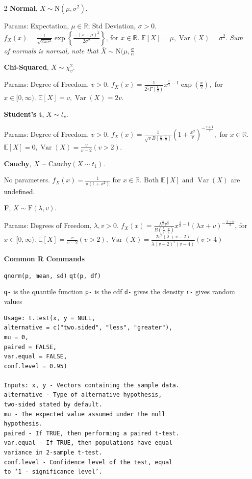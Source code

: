 \documentclass[10pt]{extarticle}
\theoremstyle{definition}
\theoremstyle{remark}
\newcommand{\R}{\mathbb{R}}
\newcommand{\E}{\mathbb{E}}
\DeclareMathOperator{\Var}{Var}
\begin{document}
\begin{multicols}{2}
    \textbf{Normal}, $X \sim \text{N}(\mu, \sigma^2)$.

    Params: Expectation, $\mu \in \R$; Std Deviation, $\sigma > 0$.
    $f_X(x) = \frac{1}{\sqrt{2 \pi \sigma^2}}\exp\left\{ \frac{-(x - \mu)^2}{2
    \sigma^2} \right\}$, for $x \in \R$.
    $\E[X] = \mu, \Var(X) = \sigma^2$.
    \textit{Sum of normals is normal, note that $\bar{X} \sim \text{N}(\mu, \frac{\sigma}{n}$}

    \textbf{Chi-Squared}, $X \sim \chi^2_{v}$.

    Params: Degree of Freedom, $v > 0$.
    $f_X(x) = \frac{1}{2^{\frac{v}{2}}\Gamma\left(\frac{k}{2}\right)}
            x^{\frac{v}{2}-1} \exp\left(\frac{x}{2}\right),$
    for $x \in [0, \infty)$.
    $\E[X] = v, \Var(X) = 2v$.

    \textbf{Student's $\mathbf{t}$}, $X \sim t_v$.

    Params: Degree of Freedom, $v > 0$.
    $f_X(x) = \frac{1}{\sqrt{v}B\left(\frac{v}{2},\frac{1}{2}\right)}
    \left(1 + \frac{x^2}{v}\right)^{-\frac{v+1}{2}},$
    for $x \in \R$.
    $\E[X] = 0, \Var(X) = \frac{v}{v-2}(v > 2)$.

    \textbf{Cauchy}, $X \sim \text{Cauchy} (X \sim t_1)$.

    No parameters. 
    $f_X(x) = \frac{1}{\pi (1 + x^2)}$ for $x \in \R$.
    Both $\E[X]$ and $\Var(X)$ are undefined.

    \textbf{F}, $X \sim \text{F}(\lambda, v)$.

    Params: Degrees of Freedom, $\lambda, v > 0$.
    $f_X(x) = \frac{\lambda^{\frac{\lambda}{2}}v^{\frac{v}{2}}}{B\left(\frac{\lambda}{2},\frac{v}{2}\right)}
    x^{\frac{\lambda}{2} - 1}(\lambda x + v)^{- \frac{\lambda + v}{2}}$,
    for $x \in [0, \infty)$. 
    $\E[X] = \frac{v}{v - 2} (v > 2), 
    \Var(X) = \frac{2v^2(\lambda + v - 2)}{\lambda(v - 2)^2(v - 4)} (v > 4) $


    \noindent
    {\large\textbf{Common R Commands}}

    \verb|qnorm(p, mean, sd)|
    \verb|qt(p, df)|

    \verb|q-| is the quantile function
    \verb|p-| is the cdf
    \verb|d-| gives the density
    \verb|r-| gives random values

    \begin{verbatim}
Usage: t.test(x, y = NULL, 
alternative = c("two.sided", "less", "greater"),
mu = 0, 
paired = FALSE, 
var.equal = FALSE, 
conf.level = 0.95)

Inputs: x, y - Vectors containing the sample data. 
alternative - Type of alternative hypothesis, 
two-sided stated by default. 
mu - The expected value assumed under the null 
hypothesis. 
paired - If TRUE, then performing a paired t-test. 
var.equal - If TRUE, then populations have equal 
variance in 2-sample t-test. 
conf.level - Confidence level of the test, equal 
to ‘1 - significance level’.
    \end{verbatim}
\end{multicols}
\end{document}
